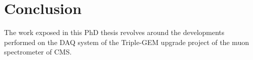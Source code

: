 \chapter*{Conclusion}
\label{chap:IV-0-conclusion}

  The work exposed in this PhD thesis revolves around the developments performed on the DAQ system of the Triple-GEM upgrade project of the muon spectrometer of CMS. 
